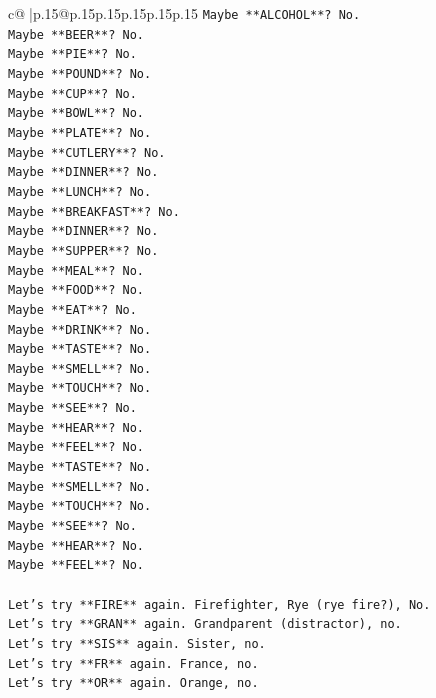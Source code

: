 \documentclass{article}
\begin{document}
{\begin{supertabular}{c@{$\;$}|p{.15\linewidth}@{}p{.15\linewidth}p{.15\linewidth}p{.15\linewidth}p{.15\linewidth}p{.15\linewidth}}
{{{\texttt{Maybe **ALCOHOL**? No.} \\
\texttt{Maybe **BEER**? No.} \\
\texttt{Maybe **PIE**? No.} \\
\texttt{Maybe **POUND**? No.} \\
\texttt{Maybe **CUP**? No.} \\
\texttt{Maybe **BOWL**? No.} \\
\texttt{Maybe **PLATE**? No.} \\
\texttt{Maybe **CUTLERY**? No.} \\
\texttt{Maybe **DINNER**? No.} \\
\texttt{Maybe **LUNCH**? No.} \\
\texttt{Maybe **BREAKFAST**? No.} \\
\texttt{Maybe **DINNER**? No.} \\
\texttt{Maybe **SUPPER**? No.} \\
\texttt{Maybe **MEAL**? No.} \\
\texttt{Maybe **FOOD**? No.} \\
\texttt{Maybe **EAT**? No.} \\
\texttt{Maybe **DRINK**? No.} \\
\texttt{Maybe **TASTE**? No.} \\
\texttt{Maybe **SMELL**? No.} \\
\texttt{Maybe **TOUCH**? No.} \\
\texttt{Maybe **SEE**? No.} \\
\texttt{Maybe **HEAR**? No.} \\
\texttt{Maybe **FEEL**? No.} \\
\texttt{Maybe **TASTE**? No.} \\
\texttt{Maybe **SMELL**? No.} \\
\texttt{Maybe **TOUCH**? No.} \\
\texttt{Maybe **SEE**? No.} \\
\texttt{Maybe **HEAR**? No.} \\
\texttt{Maybe **FEEL**? No.} \\
\\ 
\texttt{Let's try **FIRE** again. Firefighter, Rye (rye fire?), No.} \\
\texttt{Let's try **GRAN** again. Grandparent (distractor), no.} \\
\texttt{Let's try **SIS** again. Sister, no.} \\
\texttt{Let's try **FR** again. France, no.} \\
\texttt{Let's try **OR** again. Orange, no.} \\
}}}
\end{supertabular}}
\end{document}
